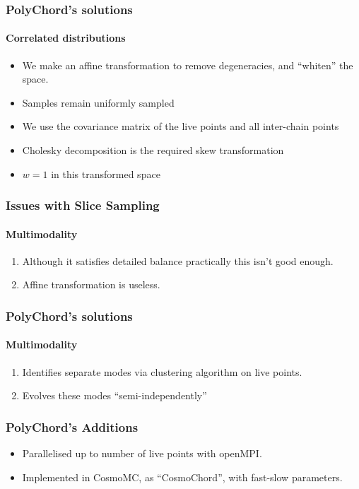 \documentclass[]{beamer}
\begin{document}
\begin{frame}
  \frametitle{PolyChord's solutions}
  \framesubtitle{Correlated distributions}

  \begin{itemize}
    \pause\item We make an affine transformation to remove degeneracies, and ``whiten'' the space.
    \pause\item Samples remain uniformly sampled
    \pause\item We use the covariance matrix of the live points and all inter-chain points 
    \pause\item Cholesky decomposition is the required skew transformation
    \pause\item $w=1$ in this transformed space
  \end{itemize}
\end{frame}


\begin{frame}
  \frametitle{Issues with Slice Sampling}
  \framesubtitle{Multimodality}

  \begin{enumerate}
    \pause\item Although it satisfies detailed balance practically this isn't good enough.
    \pause\item Affine transformation is useless.
  \end{enumerate}
\end{frame}

\begin{frame}
  \frametitle{PolyChord's solutions}
  \framesubtitle{Multimodality}

  \begin{enumerate}
    \pause\item Identifies separate modes via clustering algorithm on live points.
    \pause\item Evolves these modes ``semi-independently''
  \end{enumerate}
\end{frame}

\begin{frame}
  \frametitle{PolyChord's Additions}

  \begin{itemize}
    \pause\item Parallelised up to number of live points with openMPI.
    \pause\item Implemented in CosmoMC, as ``CosmoChord'', with fast-slow parameters.
  \end{itemize}
\end{frame}
\end{document}
